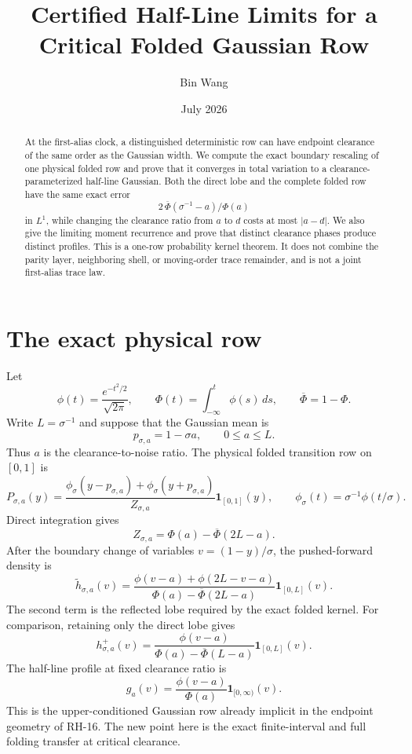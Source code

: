 \documentclass[11pt]{article}
\title{Certified Half-Line Limits for a Critical Folded Gaussian Row}
\author{Bin Wang}
\date{July 2026}
\theoremstyle{remark}
\begin{document}
\maketitle

\begin{abstract}
At the first-alias clock, a distinguished deterministic row can have endpoint
clearance of the same order as the Gaussian width.  We compute the exact
boundary rescaling of one physical folded row and prove that it converges in
total variation to a clearance-parameterized half-line Gaussian.  Both the
direct lobe and the complete folded row have the same exact error
\[
 2\,\overline\Phi(\sigma^{-1}-a)/\Phi(a)
\]
in $L^1$, while changing the clearance ratio from $a$ to $d$ costs at most
$|a-d|$.  We also give the limiting moment recurrence and prove that distinct
clearance phases produce distinct profiles.  This is a one-row probability
kernel theorem.  It does not combine the parity layer, neighboring shell, or
moving-order trace remainder, and is not a joint first-alias trace law.
\end{abstract}

\section{The exact physical row}

Let
\[
 \phi(t)=\frac{e^{-t^2/2}}{\sqrt{2\pi}},\qquad
 \Phi(t)=\int_{-\infty}^t\phi(s)\,ds,\qquad
 \overline\Phi=1-\Phi.
\]
Write $L=\sigma^{-1}$ and suppose that the Gaussian mean is
\[
 p_{\sigma,a}=1-\sigma a,\qquad 0\le a\le L.
\]
Thus $a$ is the clearance-to-noise ratio.  The physical folded transition
row on $[0,1]$ is
\begin{equation}\label{eq:physical-row}
 P_{\sigma,a}(y)=
 \frac{\phi_\sigma(y-p_{\sigma,a})+\phi_\sigma(y+p_{\sigma,a})}
 {Z_{\sigma,a}}\mathbf1_{[0,1]}(y),
 \qquad
 \phi_\sigma(t)=\sigma^{-1}\phi(t/\sigma).
\end{equation}
Direct integration gives
\begin{equation}\label{eq:folded-normalizer}
 Z_{\sigma,a}=\Phi(a)-\overline\Phi(2L-a).
\end{equation}
After the boundary change of variables $v=(1-y)/\sigma$, the pushed-forward
density is
\begin{equation}\label{eq:folded-density}
 \widetilde h_{\sigma,a}(v)=
 \frac{\phi(v-a)+\phi(2L-v-a)}
 {\Phi(a)-\overline\Phi(2L-a)}\mathbf1_{[0,L]}(v).
\end{equation}
The second term is the reflected lobe required by the exact folded kernel.
For comparison, retaining only the direct lobe gives
\begin{equation}\label{eq:direct-density}
 h^+_{\sigma,a}(v)=
 \frac{\phi(v-a)}{\Phi(a)-\overline\Phi(L-a)}
 \mathbf1_{[0,L]}(v).
\end{equation}
The half-line profile at fixed clearance ratio is
\begin{equation}\label{eq:limit-density}
 g_a(v)=\frac{\phi(v-a)}{\Phi(a)}\mathbf1_{[0,\infty)}(v).
\end{equation}
This is the upper-conditioned Gaussian row already implicit in the endpoint
geometry of RH-16.  The new point here is the exact finite-interval and full
folding transfer at critical clearance.
\end{document}
